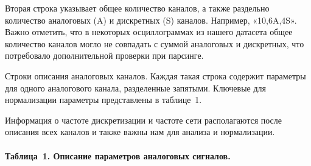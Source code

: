 Вторая строка указывает общее количество каналов, а также раздельно количество
аналоговых (A) и дискретных (S) каналов. Например, «10,6A,4S». Важно отметить, что в
некоторых осциллограммах из нашего датасета общее количество каналов могло не совпадать
с суммой аналоговых и дискретных, что потребовало дополнительной проверки при
парсинге.\par\vspace{0.2cm}

Строки описания аналоговых каналов. Каждая такая строка содержит параметры для одного
аналогового канала, разделенные запятыми. Ключевые для нормализации параметры
представлены в таблице~1.\par\vspace{0.2cm}

Информация о частоте дискретизации и частоте сети располагаются после описания всех
каналов и также важны нам для анализа и нормализации.\par\vspace{0.2cm}

\paragraph{Таблица~1. Описание параметров аналоговых сигналов.}
\label{tab:ch03_analog_signals_parameters}


